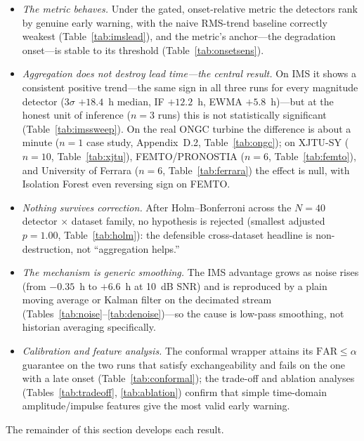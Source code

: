 \documentclass[IJPHM, 2026, 0]{PHMSociety}
\begin{document}
\begin{itemize}
\item[(i)] \emph{The metric behaves.} Under the gated, onset-relative metric the detectors rank by genuine early warning, with the naive RMS-trend baseline correctly weakest (Table~\ref{tab:imslead}), and the metric's anchor---the degradation onset---is stable to its threshold (Table~\ref{tab:onsetsens}).
\item[(ii)] \emph{Aggregation does not destroy lead time---the central result.} On IMS it shows a consistent positive trend---the same sign in all three runs for every magnitude detector ($3\sigma$ $+18.4$~h median, IF $+12.2$~h, EWMA $+5.8$~h)---but at the honest unit of inference ($n=3$ runs) this is not statistically significant (Table~\ref{tab:imssweep}). On the real ONGC turbine the difference is about a minute ($n=1$ case study, Appendix~D.2, Table~\ref{tab:ongc}); on XJTU-SY ($n=10$, Table~\ref{tab:xjtu}), FEMTO/PRONOSTIA ($n=6$, Table~\ref{tab:femto}), and University of Ferrara ($n=6$, Table~\ref{tab:ferrara}) the effect is null, with Isolation Forest even reversing sign on FEMTO.
\item[(iii)] \emph{Nothing survives correction.} After Holm--Bonferroni across the $N=40$ detector $\times$ dataset family, no hypothesis is rejected (smallest adjusted $p = 1.00$, Table~\ref{tab:holm}): the defensible cross-dataset headline is non-destruction, not ``aggregation helps.''
\item[(iv)] \emph{The mechanism is generic smoothing.} The IMS advantage grows as noise rises (from $-0.35$~h to $+6.6$~h at 10~dB SNR) and is reproduced by a plain moving average or Kalman filter on the decimated stream (Tables~\ref{tab:noise}--\ref{tab:denoise})---so the cause is low-pass smoothing, not historian averaging specifically.
\item[(v)] \emph{Calibration and feature analysis.} The conformal wrapper attains its $\text{FAR} \le \alpha$ guarantee on the two runs that satisfy exchangeability and fails on the one with a late onset (Table~\ref{tab:conformal}); the trade-off and ablation analyses (Tables~\ref{tab:tradeoff}, \ref{tab:ablation}) confirm that simple time-domain amplitude/impulse features give the most valid early warning.
\end{itemize}
The remainder of this section develops each result.
\end{document}

